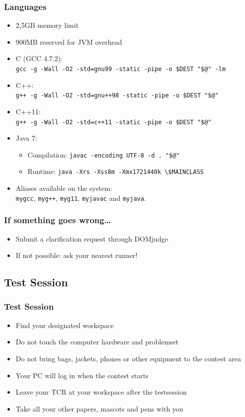 \documentclass[t]{beamer}
\begin{document}
\begin{frame}[fragile]
	\frametitle{Languages}
	\begin{itemize}
		\item 2,5GB memory limit
		\item 900MB reserved for JVM overhead
		\item C (GCC 4.7.2):\\    \lstinline|gcc -g -Wall -O2 -std=gnu99 -static -pipe -o $DEST "$@" -lm|
		\item C++:\\  \lstinline|g++ -g -Wall -O2 -std=gnu++98 -static -pipe -o $DEST "$@"|
		\item C++11:\\\lstinline|g++ -g -Wall -O2 -std=c++11 -static -pipe -o $DEST "$@"|
		\item Java 7:
		\begin{itemize}
			\item Compilation: \lstinline|javac -encoding UTF-8 -d . "$@"|
			\item Runtime: \lstinline|java -Xrs -Xss8m -Xmx1721440k \$MAINCLASS|
		\end{itemize}
		\item Aliases available on the system:\\
		\lstinline|mygcc|, \lstinline|myg++|, \lstinline|myg11|, \lstinline|myjavac| and \lstinline|myjava|.
	\end{itemize}
\end{frame}
\begin{frame}
	\frametitle{If something goes wrong\ldots}
	\begin{itemize}
		\item Submit a clarification request through DOMjudge
		\item If not possible: ask your nearest runner!
	\end{itemize}
\end{frame}

\QuestionsFrame
\subsection{Test Session}
\begin{frame}
	\frametitle{Test Session}
	\begin{itemize}
		\item Find your designated workspace
		\item Do not touch the computer hardware and problemset
		\item Do not bring bags, jackets, phones or other equipment to the contest area
		\item Your PC will log in when the contest starts
		\item Leave your TCR at your workspace after the testsession
		\item Take all your other papers, mascots and pens with you
	\end{itemize}
\end{frame}
\end{document}

